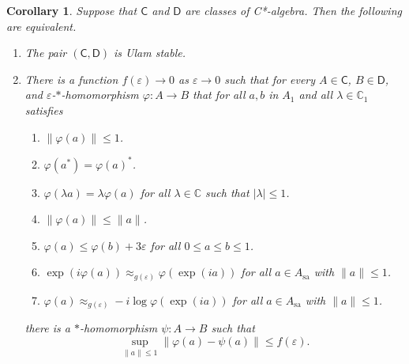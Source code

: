 \documentclass[11pt]{amsproc}
\newcommand{\cstar}{C*}
\newcommand{\sfC}{\mathsf C}
\newcommand{\sfD}{\mathsf D}
\newcommand{\bbC}{\mathbb C}
\theoremstyle{definition}
\theoremstyle{plain}
\newtheorem{corollary}[definition]{Corollary}
\theoremstyle{remark}
\begin{document}
\begin{corollary}\label{C.UlamStableCorrected}
Suppose that $\sfC$ and $\sfD$  are classes of \cstar-algebra. Then the following are equivalent. 
\begin{enumerate}
	\item\label{1.C.Ulam.Corrected} The pair $(\sfC,\sfD)$ is Ulam stable. 
\item\label{2.C.Ulam.Corrected} There is a function $f(\varepsilon)\to 0$ as $\varepsilon\to 0$ such that for every $A\in \sfC$, $B\in \sfD$, and $\varepsilon$-$*$-homomorphism $\varphi\colon A\to B$  that for all $a,b$ in $A_1$ and all $\lambda\in \bbC_1$ satisfies
\begin{enumerate}[label=(C\arabic*)]
	\item\label{Corrected.norm} $\|\varphi(a)\|\leq 1$.
	\item \label{Corrected.*} $\varphi(a^*)=\varphi(a)^*$. 
	\item \label{Corrected.scalar} $\varphi(\lambda a)=\lambda \varphi(a)$ for all $\lambda\in \bbC$ such that $|\lambda|\leq 1$. 
	\item \label{Corrected.ctns}$\|\varphi(a)\|\leq \|a\|$. 
	\item \label{Corrected.leq} $\varphi(a)\leq \varphi(b)+3\varepsilon$ for all $0\leq a\leq b\leq 1$. 
	\item \label{Corrected.exp} $\exp(i\varphi(a))\approx_{g(\varepsilon )}\varphi(\exp(i a))$ for all $a\in A_{\textrm{sa}}$ with $\|a\|\leq 1$. 
	\item \label{Corrected.log} $\varphi(a)\approx_{g(\varepsilon)} -i \log \varphi(\exp(ia))$ for all $a\in A_{\textrm{sa}}$ with $\|a\|\leq 1$.
\end{enumerate}
%
there is a $*$-homomorphism $\psi\colon A\to B$ such that $$\sup_{\|a\|\le 1}\|\varphi(a)-\psi(a)\|\le f(\varepsilon).$$
\end{enumerate}
\end{corollary}
\end{document}
